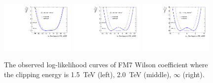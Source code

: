 \begin{figure}[ht]
    \centering
    \includegraphics[width=0.32\textwidth]{figures/aQGC/profileFM71500}
    	\includegraphics[width=0.32\textwidth]{figures/aQGC/profileFM72000}
        \includegraphics[width=0.32\textwidth]{figures/aQGC/profileFM7inf}
        \caption{The observed log-likelihood curves of FM7 Wilson coefficient where the clipping energy is 1.5~TeV (left), 2.0~TeV (middle), $\infty$ (right).}
        \label{fig:ProfileLLFM7}
\end{figure}


